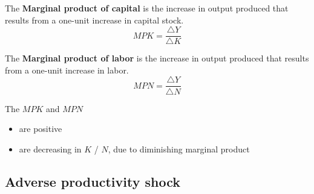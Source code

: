 \begin{definition}
    The \textbf{Marginal product of capital} is the increase in output produced that results from a one-unit increase in capital stock. 
    \[
        MPK = \frac{\triangle Y}{\triangle K}
    \]
\end{definition}

\begin{definition}
    The \textbf{Marginal product of labor} is the increase in output produced that results from a one-unit increase in labor. 
    \[
        MPN = \frac{\triangle Y}{\triangle N}
    \]
\end{definition}

\begin{remarks}
    The $MPK$ and $MPN$
    \begin{itemize}
        \item are positive 
        \item are decreasing in $K$ / $N$, due to diminishing marginal product
    \end{itemize} 
\end{remarks}

\subsection{Adverse productivity shock}

